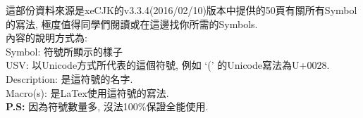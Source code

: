 
這部份資料來源是xeCJK的v3.3.4(2016/02/10)版本中提供的50頁有關所有Symbol的寫法, 極度值得同學們閱讀或在這邊找你所需的Symbols.\\

內容的說明方式為:\\
Symbol: 符號所顯示的樣子\\
USV: 以Unicode方式所代表的這個符號, 例如 `(' 的Unicode寫法為U+0028.\\
Description: 是這符號的名字.\\
Macro(s): 是LaTex使用這符號的寫法.\\

\textbf{P.S: }因為符號數量多, 沒法100\%保證全能使用.



\EndChapter
